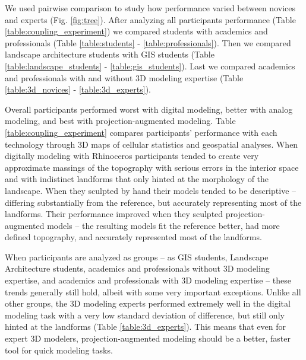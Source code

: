 \documentclass[prodmode,acmtochi]{acmsmall} %
\begin{document}



We used pairwise comparison to study 
how performance varied between 
novices and experts (Fig. \ref{fig:tree}).
%
After analyzing all participants performance 
(Table \ref{table:coupling_experiment})
we compared students with academics and professionals 
(Table \ref{table:students} - \ref{table:professionals}). 
Then we compared landscape architecture students with GIS students
(Table \ref{table:landscape_students} - \ref{table:gis_students}).
Last we compared academics and professionals 
with and without 3D modeling expertise (Table \ref{table:3d_novices} - \ref{table:3d_experts}).


Overall participants performed 
worst with digital modeling, 
better with analog modeling, 
and best with projection-augmented modeling.
%
Table \ref{table:coupling_experiment} 
compares participants' performance with each technology
through 3D maps of cellular statistics 
and geospatial analyses.
%
When digitally modeling with Rhinoceros 
participants tended to 
create very approximate massings of the topography
with serious errors in the interior space and
with indistinct landforms
that only hinted at the morphology of the landscape.
%
When they sculpted by hand
their models tended to be descriptive -- 
differing substantially from the reference, but
accurately representing most of the landforms. 
%
Their performance improved 
when they sculpted projection-augmented models --
the resulting models
fit the reference better, 
had more defined topography, 
and accurately represented most of the landforms.


When participants are analyzed as groups 
-- as GIS students, Landscape Architecture students, 
academics and professionals without 3D modeling expertise, 
and academics and professionals with 3D modeling expertise -- 
these trends generally still hold, 
albeit with some very important exceptions.
%
Unlike all other groups, 
the 3D modeling experts performed extremely well 
in the digital modeling task
with a very low standard deviation of difference, 
but still only hinted at the landforms 
(Table \ref{table:3d_experts}). 
%
This means that even for expert 3D modelers,
projection-augmented modeling 
should be a better, faster tool 
for quick modeling tasks. 
\end{document}
